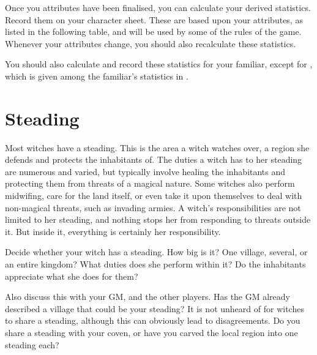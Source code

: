Once you attributes have been finalised, you can calculate your derived statistics.
Record them on your character sheet.
These are based upon your attributes, as listed in the following table, and will be used by some of the rules of the game.
Whenever your attributes change, you should also recalculate these statistics.

You should also calculate and record these statistics for your familiar, except for , which is given among the familiar's statistics in .


\section{Steading}

Most witches have a steading.
This is the area a witch watches over, a region she defends and protects the inhabitants of.
The duties a witch has to her steading are numerous and varied, but typically involve healing the inhabitants and protecting them from threats of a magical nature.
Some witches also perform midwifing, care for the land itself, or even take it upon themselves to deal with non-magical threats, such as invading armies.
A witch's responsibilities are not limited to her steading, and nothing stops her from responding to threats outside it.
But inside it, everything is certainly her responsibility.

Decide whether your witch has a steading.
How big is it?
One village, several, or an entire kingdom?
What duties does she perform within it?
Do the inhabitants appreciate what she does for them?

Also discuss this with your GM, and the other players.
Has the GM already described a village that could be your steading?
It is not unheard of for witches to share a steading, although this can obviously lead to disagreements.
Do you share a steading with your coven, or have you carved the local region into one steading each?

